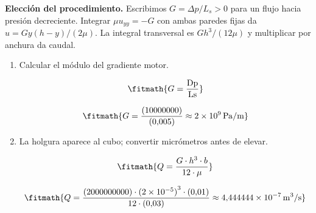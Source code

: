 \noindent\textbf{Elección del procedimiento.} Escribimos $G=\Delta p/L_s>0$ para un flujo hacia presión decreciente. Integrar $\mu u_{yy}=-G$ con ambas paredes fijas da $u=Gy(h-y)/(2\mu)$. La integral transversal es $Gh^3/(12\mu)$ y multiplicar por anchura da caudal.

\begin{enumerate}

\item Calcular el módulo del gradiente motor.

\[\fitmath{G=\frac{\mathrm{Dp}}{\mathrm{Ls}}}\]

\[\fitmath{G=\frac{(10000000)}{(0{,}005)}\approx 2\times10^{9}\,\mathrm{Pa/m}}\]

\item La holgura aparece al cubo; convertir micrómetros antes de elevar.

\[\fitmath{Q=\frac{G\cdot {h}^{3}\cdot b}{12\cdot \mu}}\]

\[\fitmath{Q=\frac{(2000000000)\cdot {(2\times10^{-5})}^{3}\cdot (0{,}01)}{12\cdot (0{,}03)}\approx 4{,}444444\times10^{-7}\,\mathrm{m^{3}/s}}\]

\end{enumerate}
